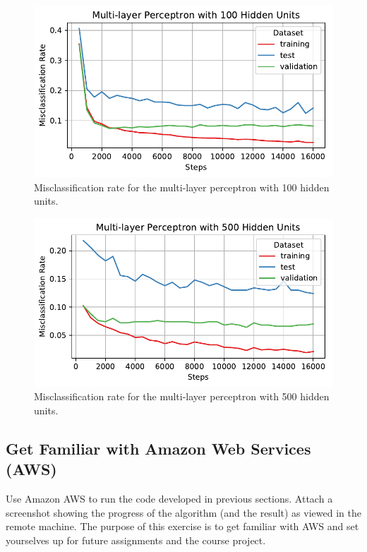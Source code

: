 \documentclass[letterpaper,11pt]{article}
\begin{document}
\begin{enumerate}
    \begin{figure}
      \centering
      \includegraphics{problem6/mlp100_misclassification.pdf}
      \caption{Misclassification rate for the multi-layer perceptron with 100 hidden units.}
      \label{fig:mlp100_misclassification}
    \end{figure}
    
    \begin{figure}
      \centering
      \includegraphics{problem6/mlp500_misclassification.pdf}
      \caption{Misclassification rate for the multi-layer perceptron with 500 hidden units.}
      \label{fig:mlp500_misclassification}
    \end{figure}

  
\end{enumerate}


\subsection*{Get Familiar with Amazon Web Services (AWS)}

Use Amazon AWS to run the code developed in previous sections. Attach a
screenshot showing the progress of the algorithm (and the result) as viewed in
the remote machine. The purpose of this exercise is to get familiar with AWS
and set yourselves up for future assignments and the course project.
\end{document}
